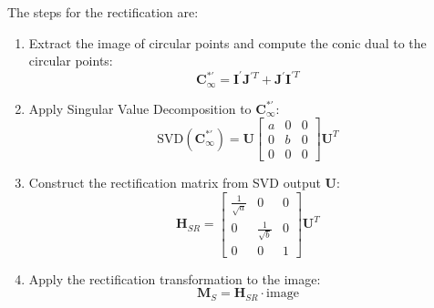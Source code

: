 \noindent The steps for the rectification are:
\begin{enumerate}
    \item Extract the image of circular points and compute the conic dual to the circular points:
        \[\mathbf{C}_{\infty}^{\ast\prime}=\mathbf{I}^{\prime}\mathbf{J}^{\prime T}+\mathbf{J}^{\prime}\mathbf{I}^{\prime T}\]
    \item Apply Singular Value Decomposition to $\mathbf{C}_{\infty}^{\ast\prime}$:
        \[\text{SVD}(\mathbf{C}_{\infty}^{\ast\prime})=\mathbf{U}\begin{bmatrix} a & 0 & 0 \\ 0 & b & 0 \\ 0 & 0 & 0 \end{bmatrix}\mathbf{U}^T\]
    \item Construct the rectification matrix from SVD output $\mathbf{U}$:
        \[\mathbf{H}_{SR}=\begin{bmatrix} \frac{1}{\sqrt{a}} & 0 & 0 \\ 0 & \frac{1}{\sqrt{b}} & 0 \\ 0 & 0 & 1 \end{bmatrix}\mathbf{U}^T\]
    \item Apply the rectification transformation to the image: 
        \[\mathbf{M}_S = \mathbf{H}_{SR} \cdot \text{image}\]
\end{enumerate}